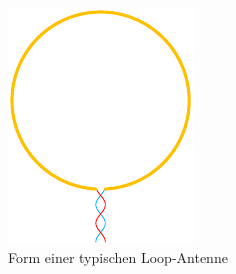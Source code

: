\begin{figure}
	\centering
	\includegraphics{papers/antennen/images/loopAntenne.pdf}
	\caption{Form einer typischen Loop-Antenne}
	\label{antennen:loopAntenne}
\end{figure}